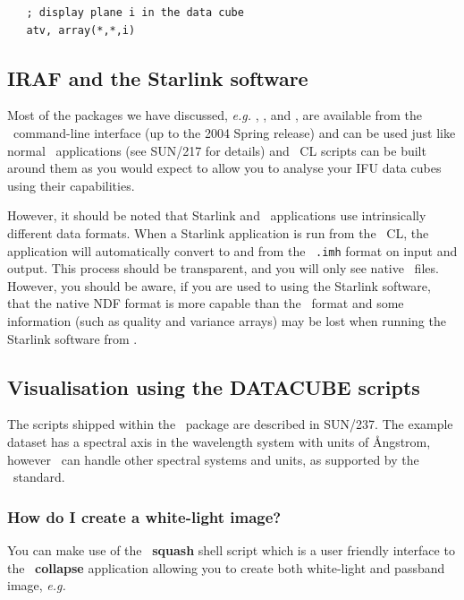 \documentclass[twoside,11pt]{article}
\newcommand{\xref}[3]{#1}
\newcommand{\xlabel}[1]{}
\begin{document}
{\small\begin{verbatim}
   ; display plane i in the data cube
   atv, array(*,*,i)
\end{verbatim}\normalsize

\subsection{\xlabel{sc16_irafstar}IRAF and the Starlink software\label{sc16_irafstar}}

Most of the packages we have discussed, \emph{e.g.} \KAPPAref,
\FIGAROref, and \CCDPACKref, are available from the \IRAFref\ command-line
interface (up to the 2004 Spring release) and can be used just like
normal \IRAF\ applications (see \xref{SUN/217}{sun217}{} for details)
and \IRAF\ CL scripts can be built around them as you would expect to
allow you to analyse your IFU data cubes using their capabilities.

However, it should be noted that Starlink and \IRAF\ applications use
intrinsically different data formats.  When a Starlink application is
run from the \IRAF\ CL, the application will automatically convert to
and from the \IRAF\ {\tt .imh} format on input and output.  This process
should be transparent, and you will only see native \IRAF\ files.
However, you should be aware, if you are used to using the Starlink
software, that the native \xref{NDF}{sun33}{} format is more capable
than the \IRAF\ format and some information (such as quality and
variance arrays) may be lost when running the Starlink software from
\IRAF.

\subsection{\xlabel{sc16_vis}Visualisation using the DATACUBE scripts\label{sc16_vis}}

The scripts shipped within the \DATACUBE\ package are described in 
\xref{SUN/237}{sun237}{}.  The example dataset has a spectral axis in
the wavelength system with units of {\AA}ngstrom, however \DATACUBE\ can
handle other spectral systems and units, as supported by the \FITSref\
standard.

\subsubsection{How do I create a white-light image?}

You can make use of the \DATACUBE\ \xref{{\bf squash}}{sun237}{squash}
shell script which is a user friendly interface to the \KAPPA\
\xref{{\bf collapse}}{sun95}{COLLAPSE} application allowing you to create
both white-light and passband image, \emph{e.g.}\

}
\end{document}
